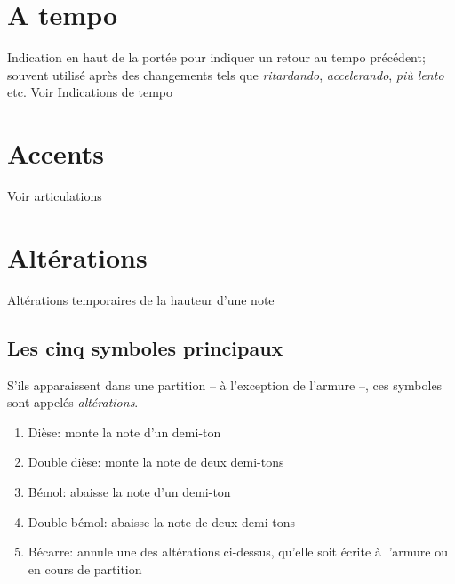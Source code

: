 \documentclass[11pt, twocolumn]{scrreprt}
\begin{document}
\section*{A tempo}
Indication en haut de la portée pour indiquer un retour au tempo précédent; souvent utilisé après des changements tels que \emph{ritardando}, \emph{accelerando}, \emph{più lento} etc. {Voir Indications de tempo}

\section*{Accents} Voir articulations

\section*{Altérations}
Altérations temporaires de la hauteur d'une note

\subsection*{Les cinq symboles principaux}
S'ils apparaissent dans une partition -- à l'exception de l'armure --, ces symboles sont appelés \emph{altérations}.
\begin{enumerate}
\item[\sharp] Dièse: monte la note d'un demi-ton
\item[\doublesharp] Double dièse: monte la note de deux demi-tons
\item[\flat] Bémol: abaisse la note d'un demi-ton
\item[\flatflat] Double bémol: abaisse la note de deux demi-tons
\item[\natural] Bécarre: annule une des altérations ci-dessus, qu'elle soit écrite à l'armure ou en cours de partition
\end{enumerate}


\end{document}
